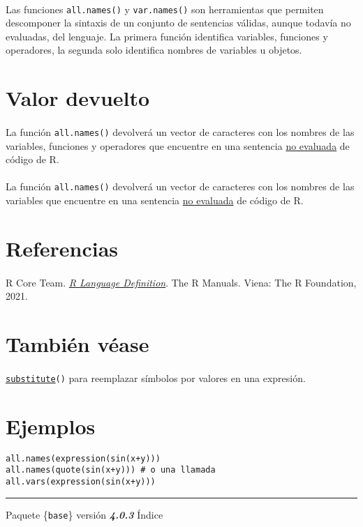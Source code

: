 \documentclass{article}[letter, 12pt]
\def\code#1{\texttt{#1}}
\begin{document}
\paragraph{}
Las funciones \code{all.names()} y \code{var.names()} son herramientas que permiten descomponer la sintaxis de un conjunto de sentencias válidas, aunque todavía no evaluadas, del lenguaje. La primera función identifica variables, funciones y operadores, la segunda solo identifica nombres de variables u objetos.
\section{\color{gray}Valor devuelto}
\paragraph{}
La función \code{all.names()} devolverá un vector de caracteres con los nombres de las variables, funciones y operadores que encuentre en una sentencia \href{run:/Vocabulary.pdf}{no evaluada} de código de R.
\paragraph{}
La función \code{all.names()} devolverá un vector de caracteres con los nombres de las variables que encuentre en una sentencia \href{run:/Vocabulary.pdf}{no evaluada} de código de R.
\section{\color{gray}Referencias}
\paragraph{}
R Core Team. \href{https://cran.r-project.org/doc/manuals/R-lang.html}{\textit{R Language Definition}}. The R Manuals. Viena: The R Foundation, 2021.
\section{\color{gray}También véase}
\paragraph{}
\href{run:/Vocabulary.pdf}{\code{substitute}}\code{()} para reemplazar símbolos por valores en una expresión.
\section{\color{gray}Ejemplos}
\code{all.names(expression(sin(x+y)))} \\
\code{all.names(quote(sin(x+y)))  \# o una llamada} \\
\code{all.vars(expression(sin(x+y)))} \\
\par\noindent\rule{\textwidth}{0.4pt}
\centerline{Paquete \{\code{base}\} versión \textbf{\emph{4.0.3}} Índice}
\end{document}
